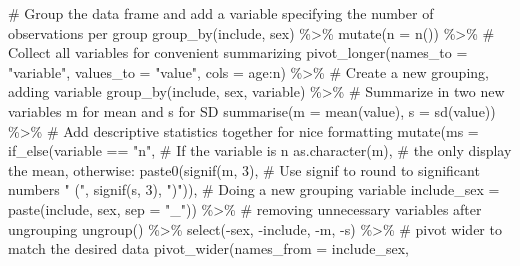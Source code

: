 \documentclass[
  11pt,
  letterpaper,
]{scrbook}
\newenvironment{Shaded}{\begin{snugshade}}{\end{snugshade}}
\newcommand{\AttributeTok}[1]{\textcolor[rgb]{0.40,0.45,0.13}{#1}}
\newcommand{\CommentTok}[1]{\textcolor[rgb]{0.37,0.37,0.37}{#1}}
\newcommand{\DecValTok}[1]{\textcolor[rgb]{0.68,0.00,0.00}{#1}}
\newcommand{\FunctionTok}[1]{\textcolor[rgb]{0.28,0.35,0.67}{#1}}
\newcommand{\NormalTok}[1]{\textcolor[rgb]{0.00,0.23,0.31}{#1}}
\newcommand{\SpecialCharTok}[1]{\textcolor[rgb]{0.37,0.37,0.37}{#1}}
\newcommand{\StringTok}[1]{\textcolor[rgb]{0.13,0.47,0.30}{#1}}
\begin{document}
\begin{Shaded}
\begin{Highlighting}[numbers=left,,]
  \CommentTok{\# Group the data frame and add a variable specifying the number of observations per group}
  \FunctionTok{group\_by}\NormalTok{(include, sex) }\SpecialCharTok{\%\textgreater{}\%}
  \FunctionTok{mutate}\NormalTok{(}\AttributeTok{n =} \FunctionTok{n}\NormalTok{()) }\SpecialCharTok{\%\textgreater{}\%}
  \CommentTok{\# Collect all variables for convenient summarizing}
  \FunctionTok{pivot\_longer}\NormalTok{(}\AttributeTok{names\_to =} \StringTok{"variable"}\NormalTok{, }
               \AttributeTok{values\_to =} \StringTok{"value"}\NormalTok{, }
               \AttributeTok{cols =}\NormalTok{ age}\SpecialCharTok{:}\NormalTok{n) }\SpecialCharTok{\%\textgreater{}\%}
  \CommentTok{\# Create a new grouping, adding variable}
  \FunctionTok{group\_by}\NormalTok{(include, sex, variable) }\SpecialCharTok{\%\textgreater{}\%}
  \CommentTok{\# Summarize in two new variables m for mean and s for SD}
  \FunctionTok{summarise}\NormalTok{(}\AttributeTok{m =} \FunctionTok{mean}\NormalTok{(value), }
            \AttributeTok{s =} \FunctionTok{sd}\NormalTok{(value)) }\SpecialCharTok{\%\textgreater{}\%}
  \CommentTok{\# Add descriptive statistics together for nice formatting}
  \FunctionTok{mutate}\NormalTok{(}\AttributeTok{ms =} \FunctionTok{if\_else}\NormalTok{(variable }\SpecialCharTok{==} \StringTok{"n"}\NormalTok{, }\CommentTok{\# If the variable is n}
                      \FunctionTok{as.character}\NormalTok{(m), }\CommentTok{\# the only display the mean, otherwise:}
                        \FunctionTok{paste0}\NormalTok{(}\FunctionTok{signif}\NormalTok{(m, }\DecValTok{3}\NormalTok{), }\CommentTok{\# Use signif to round to significant numbers}
                        \StringTok{" ("}\NormalTok{,}
                        \FunctionTok{signif}\NormalTok{(s, }\DecValTok{3}\NormalTok{), }
                        \StringTok{")"}\NormalTok{)), }
         \CommentTok{\# Doing a new grouping variable}
         \AttributeTok{include\_sex =} \FunctionTok{paste}\NormalTok{(include, sex, }\AttributeTok{sep =} \StringTok{"\_"}\NormalTok{)) }\SpecialCharTok{\%\textgreater{}\%}
  \CommentTok{\# removing unnecessary variables after ungrouping}
  \FunctionTok{ungroup}\NormalTok{() }\SpecialCharTok{\%\textgreater{}\%}
  \FunctionTok{select}\NormalTok{(}\SpecialCharTok{{-}}\NormalTok{sex, }\SpecialCharTok{{-}}\NormalTok{include, }\SpecialCharTok{{-}}\NormalTok{m, }\SpecialCharTok{{-}}\NormalTok{s) }\SpecialCharTok{\%\textgreater{}\%}
  \CommentTok{\# pivot wider to match the desired data}
  \FunctionTok{pivot\_wider}\NormalTok{(}\AttributeTok{names\_from =}\NormalTok{ include\_sex, }

\end{Highlighting}
\end{Shaded}
\end{document}
